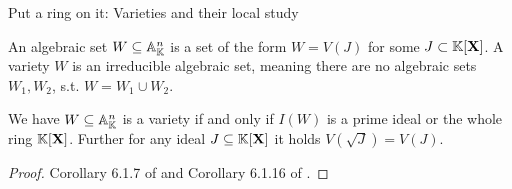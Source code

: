 \begin{subsection}{Put a ring on it: Varieties and their local study}
    \begin{definition}
        An algebraic set \( W \subseteq \mathbb{A}^{n}_{\mathbb{K}} \) is a set of the form \( W = V(J) \) for some \( J \subset \mathbb{K}[\mathbf{X}] \).
        A variety \( W \) is an irreducible algebraic set, meaning there are no algebraic sets \( W_1, W_2 \), s.t.
        \( W = W_1 \cup W_2 \).
    \end{definition}
    \begin{proposition} \label{primenessandradicalag}
        We have \( W \subseteq \mathbb{A}^{n}_{\mathbb{K}} \) is a variety if and only if \( I(W) \) is a prime ideal or the whole ring \( \mathbb{K}[\mathbf{X}] \).
        Further for any ideal \( J \subseteq \mathbb{K}[\mathbf{X}] \) it holds \( V(\sqrt{J}) = V(J) \).
    \end{proposition}
    \begin{proof}
        Corollary 6.1.7 of \cite{alggeoandcom} and Corollary 6.1.16 of \cite{alggeoandcom}.
    \end{proof}
    

\end{subsection}
